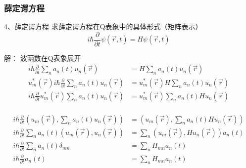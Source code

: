 \begin{frame} 
    \frametitle{薛定谔方程}
    \begin{tcolorbox1}{4、薛定谔方程}
        求薛定谔方程在Q表象中的具体形式（矩阵表示）
        $$ i\hbar \frac{\partial}{\partial t }\psi (\vec{r},t) =H\psi (\vec{r},t)$$
    \end{tcolorbox1}
    \alert{解：} 波函数在Q表象展开
    \begin{equation*}
        \begin{split}
            i\hbar \frac{\partial}{\partial t }\sum_n a_n(t) u_n(\vec{r})  &=H\sum_n a_n(t) u_n(\vec{r}) \\
            u_m ^* (\vec{r}) i\hbar \frac{\partial}{\partial t }\sum_n a_n(t) u_n(\vec{r})  &=u_m ^* (\vec{r})H\sum_n a_n(t) u_n(\vec{r}) \\
            i\hbar \frac{\partial}{\partial t }u_m ^* (\vec{r}) \sum_n a_n(t) u_n(\vec{r})  &=u_m ^* (\vec{r})\sum_n a_n(t) Hu_n(\vec{r}) \\      
        \end{split} 
    \end{equation*}
\end{frame}

\begin{frame} 
    \begin{equation*}
        \begin{split}
            i\hbar \frac{\partial}{\partial t }(u_m (\vec{r}), \sum_n a_n(t) u_n(\vec{r}) ) &=(u_m (\vec{r}), \sum_n a_n(t) Hu_n(\vec{r})) \\
            i\hbar \frac{\partial}{\partial t }\sum_n a_n(t)(u_m (\vec{r}),  u_n(\vec{r}) ) &=\sum_n (u_m (\vec{r}),  Hu_n(\vec{r}))a_n(t) \\
            i\hbar \frac{\partial}{\partial t }\sum_n a_n(t)\delta_{mn} &=\sum_n  H_{mn} a_n(t) \\
            i\hbar \frac{\partial}{\partial t } a_n(t) &=\sum_n H_{mn} a_n(t)  \\
        \end{split} 
    \end{equation*}
\end{frame}

